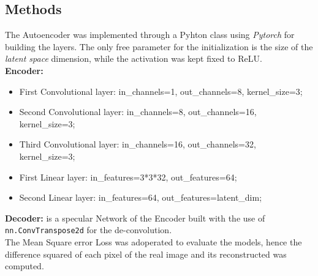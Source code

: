 \documentclass[11pt,a4paper,twocolumn]{IEEEtran}
\begin{document}
		\subsection{\textbf{Methods}}
		The Autoencoder was implemented through a Pyhton class using \textit{Pytorch} for building the layers. The only free parameter for the initialization is the size of the \textit{latent space} dimension, while the activation was kept fixed to ReLU.\medskip\\
		\textbf{Encoder:}
		\begin{itemize}
			\item First Convolutional layer: in\_channels=1, out\_channels=8, kernel\_size=3;
			\item Second Convolutional layer: in\_channels=8, out\_channels=16, kernel\_size=3;
			\item Third Convolutional layer: in\_channels=16, out\_channels=32, kernel\_size=3;
			\item First Linear layer: in\_features=3*3*32, out\_features=64;
			\item Second Linear layer: in\_features=64, out\_features=latent\_dim;
		\end{itemize}
		\textbf{Decoder:} is a specular Network of the Encoder built with the use of \texttt{nn.ConvTranspose2d} for the de-convolution.\\
		The Mean Square error Loss was adoperated to evaluate the models, hence the difference squared of each pixel of the real image and its reconstructed was computed.
\end{document}

